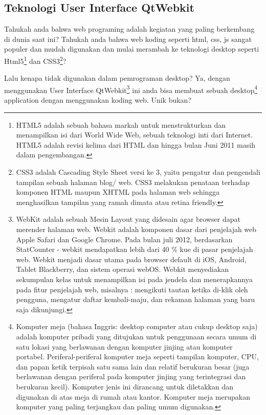 \subsection{Teknologi User Interface
QtWebkit}\label{teknologi-user-interface-qtwebkit}

Tahukah anda bahwa web programing adalah kegiatan yang paling berkembang
di dunia saat ini? Tahukah anda bahwa web koding seperti html, css, js
sangat populer dan mudah digunakan dan mulai merambah ke teknologi
desktop seperti Html5\footnote{HTML5 adalah sebuah bahasa markah untuk menstrukturkan dan menampilkan isi dari World Wide Web, sebuah teknologi inti dari Internet. HTML5 adalah revisi kelima dari HTML dan hingga bulan Juni 2011 masih dalam pengembangan.} dan CSS3\footnote{CSS3 adalah Cascading Style Sheet versi ke 3, yaitu pengatur dan pengendali tampilan sebuah halaman blog/ web. CSS3 melakukan penataan terhadap komponen HTML maupun XHTML pada halaman web sehingga menghasilkan tampilan yang ramah dimata atau retina friendly.}?

Lalu kenapa tidak digunakan dalam pemrograman desktop? Ya, dengan
menggunakan User Interface QtWebkit\footnote{WebKit adalah sebuah Mesin Layout yang didesain agar browser dapat merender halaman web. Webkit adalah komponen dasar dari penjelajah web Apple Safari dan Google Chrome. Pada bulan juli 2012, berdasarkan StatCounter - webkit mendapatkan lebih dari 40 \% kue di pasar penjelajah web. Webkit menjadi dasar utama pada browser default di iOS, Android, Tablet Blackberry, dan sistem operasi webOS. Webkit menyediakan sekumpulan kelas untuk menampilkan isi pada jendela dan menerapkannya pada fitur penjelajah web, misalnya : mengikuti tautan ketika di-klik oleh pengguna, mengatur daftar kembali-maju, dan rekaman halaman yang baru saja dikunjungi.} ini anda bisa membuat sebuah desktop\footnote{Komputer meja (bahasa Inggris: desktop computer atau cukup desktop saja) adalah komputer pribadi yang ditujukan untuk penggunaan secara umum di satu lokasi yang berlawanan dengan komputer jinjing atau komputer portabel. Periferal-periferal komputer meja seperti tampilan komputer, CPU, dan papan ketik terpisah satu sama lain dan relatif berukuran besar (juga berlawanan dengan periferal pada komputer jinjing yang terintegrasi dan berukuran kecil). Komputer jenis ini dirancang untuk diletakkan dan digunakan di atas meja di rumah atau kantor. Komputer meja merupakan komputer yang paling terjangkau dan paling umum digunakan.}
application dengan menggunakan koding web. Unik bukan?

